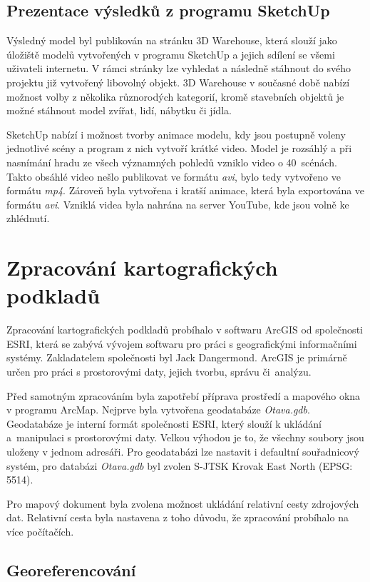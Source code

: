 \documentclass[thesis=M,czech]{FITthesis}[2012/06/26]
\begin{document}
\clearpage

\subsection{Prezentace výsledků z programu SketchUp}
Výsledný model byl publikován na stránku 3D Warehouse, která slouží jako úložiště modelů vytvořených v programu SketchUp a jejich sdílení se všemi uživateli internetu. V rámci stránky lze vyhledat a následně stáhnout do svého projektu již vytvořený libovolný objekt. 3D Warehouse v současné době nabízí možnost volby z několika různorodých kategorií, kromě stavebních objektů je možné stáhnout model zvířat, lidí, nábytku či jídla. 

SketchUp nabízí i možnost tvorby animace modelu, kdy jsou postupně voleny jednotlivé scény a program z nich vytvoří krátké video. Model je rozsáhlý a při nasnímání hradu ze všech významných pohledů vzniklo video o 40~scénách. Takto obsáhlé video nešlo publikovat ve formátu \textit{avi}, bylo tedy vytvořeno ve formátu \textit{mp4}. Zároveň byla vytvořena i kratší animace, která byla exportována ve formátu \textit{avi}. Vzniklá videa byla nahrána na server YouTube, kde jsou volně ke zhlédnutí. 


\section{Zpracování kartografických podkladů}
Zpracování kartografických podkladů probíhalo v softwaru ArcGIS od společnosti ESRI, která se zabývá vývojem softwaru pro práci s geografickými informačními systémy. Zakladatelem společnosti byl Jack Dangermond. ArcGIS je primárně určen pro práci s prostorovými daty, jejich tvorbu, správu či~analýzu.

Před samotným zpracováním byla zapotřebí příprava prostředí a mapového okna v programu ArcMap. Nejprve byla vytvořena geodatabáze \textit{Otava.gdb}. Geodatabáze je interní formát společnosti ESRI, který slouží k ukládání a~manipulaci s prostorovými daty. Velkou výhodou je to, že všechny soubory jsou uloženy v jednom adresáři. Pro geodatabázi lze nastavit i defaultní souřadnicový systém, pro databázi \textit{Otava.gdb} byl zvolen S-JTSK Krovak East North (EPSG: 5514).

Pro mapový dokument byla zvolena možnost ukládání relativní cesty zdrojových dat. Relativní cesta byla nastavena z toho důvodu, že zpracování probíhalo na více počítačích. 


\subsection{Georeferencování}
\end{document}

